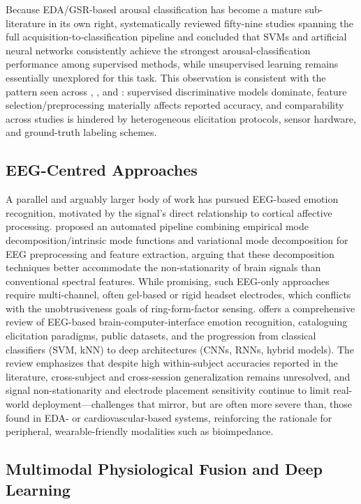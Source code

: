 Because EDA/GSR-based arousal classification has become a mature sub-literature in its own right, \cite{sanchezreolid2022machine} systematically reviewed fifty-nine studies spanning the full acquisition-to-classification pipeline and concluded that SVMs and artificial neural networks consistently achieve the strongest arousal-classification performance among supervised methods, while unsupervised learning remains essentially unexplored for this task. This observation is consistent with the pattern seen across \cite{ayata2017emotion}, \cite{fan2023human}, and \cite{machot2019deep}: supervised discriminative models dominate, feature selection/preprocessing materially affects reported accuracy, and comparability across studies is hindered by heterogeneous elicitation protocols, sensor hardware, and ground-truth labeling schemes.

\subsection{EEG-Centred Approaches}

A parallel and arguably larger body of work has pursued EEG-based emotion recognition, motivated by the signal's direct relationship to cortical affective processing. \cite{alhalaseh2020machine} proposed an automated pipeline combining empirical mode decomposition/intrinsic mode functions and variational mode decomposition for EEG preprocessing and feature extraction, arguing that these decomposition techniques better accommodate the non-stationarity of brain signals than conventional spectral features. While promising, such EEG-only approaches require multi-channel, often gel-based or rigid headset electrodes, which conflicts with the unobtrusiveness goals of ring-form-factor sensing. \cite{houssein2022human} offers a comprehensive review of EEG-based brain-computer-interface emotion recognition, cataloguing elicitation paradigms, public datasets, and the progression from classical classifiers (SVM, kNN) to deep architectures (CNNs, RNNs, hybrid models). The review emphasizes that despite high within-subject accuracies reported in the literature, cross-subject and cross-session generalization remains unresolved, and signal non-stationarity and electrode placement sensitivity continue to limit real-world deployment---challenges that mirror, but are often more severe than, those found in EDA- or cardiovascular-based systems, reinforcing the rationale for peripheral, wearable-friendly modalities such as bioimpedance.

\subsection{Multimodal Physiological Fusion and Deep Learning}

